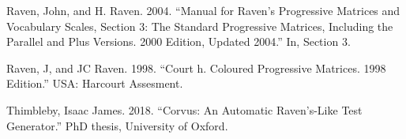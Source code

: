\documentclass[
]{article}
\newlength{\cslhangindent}
\newenvironment{CSLReferences}[2] %
 {\begin{list}{}{%
  \setlength{\itemindent}{0pt}
  \setlength{\leftmargin}{0pt}
  \setlength{\parsep}{0pt}
  \ifodd #1
   \setlength{\leftmargin}{\cslhangindent}
   \setlength{\itemindent}{-1\cslhangindent}
  \fi
  \setlength{\itemsep}{#2\baselineskip}}}
 {\end{list}}
\begin{document}
\begin{CSLReferences}{1}{0}
Raven, John, and H. Raven. 2004. {``Manual for {Raven}'s {Progressive}
{Matrices} and {Vocabulary} {Scales}, {Section} 3: {The} {Standard}
{Progressive} {Matrices}, {Including} the {Parallel} and {Plus}
{Versions}. 2000 {Edition}, Updated 2004.''} In, Section 3.

Raven, J, and JC Raven. 1998. {``Court h. Coloured Progressive Matrices.
1998 Edition.''} USA: Harcourt Assesment.

Thimbleby, Isaac James. 2018. {``Corvus: An Automatic Raven's-Like Test
Generator.''} PhD thesis, University of Oxford.

\end{CSLReferences}
\end{document}
